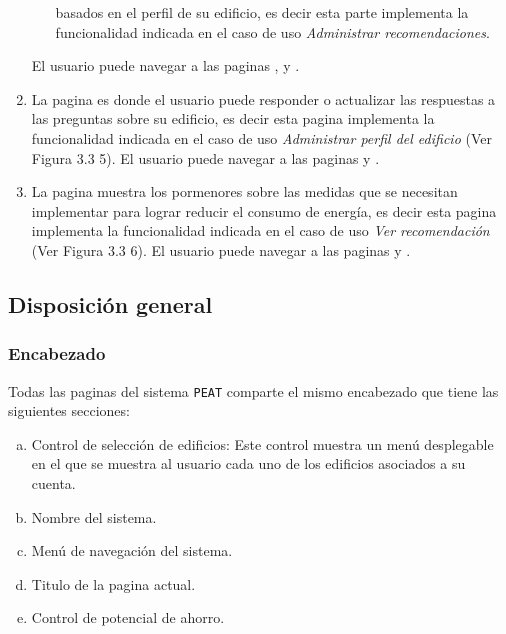 \begin{enumerate}
\begin{itemize}
    basados en el perfil de su edificio, es decir esta parte
    implementa la funcionalidad indicada en el caso de uso
    \textit{Administrar recomendaciones}.
  \end{itemize}
  El usuario puede navegar a las paginas ,
   y .
\item La pagina  es donde el usuario
  puede responder o actualizar las respuestas a las preguntas sobre su edificio,
  es decir esta pagina implementa la funcionalidad indicada en el caso de uso
  \textit{Administrar perfil del edificio} (Ver Figura 3.3 5).
  El usuario puede navegar a las paginas  y
  .
\item La pagina  muestra los pormenores sobre
  las medidas que se necesitan implementar para lograr reducir el consumo de energía,
  es decir esta pagina implementa la funcionalidad indicada en el caso de uso
  \textit{Ver recomendación} (Ver Figura 3.3 6).
  El usuario puede navegar a las paginas  y
  .
\end{enumerate}


\subsection{Disposición general}

\subsubsection{Encabezado}

Todas las paginas del sistema \texttt{PEAT} comparte el mismo encabezado
que tiene las siguientes secciones:

\begin{enumerate}[a)]
\item Control de selección de edificios: Este control muestra un menú
  desplegable en el que se muestra al usuario cada uno de los edificios
  asociados a su cuenta.
\item Nombre del sistema.
\item Menú de navegación del sistema.
\item Titulo de la pagina actual.
\item Control de potencial de ahorro.
\end{enumerate}

